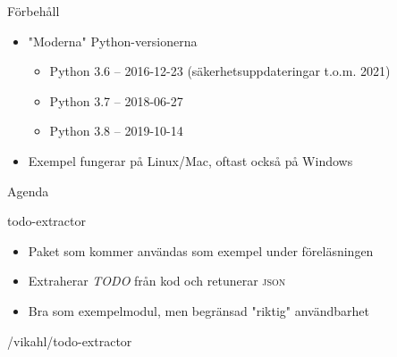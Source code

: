 \begin{frame}{Förbehåll}
  \begin{itemize}
    \item "Moderna" Python-versionerna
      \begin{itemize}
        \item Python 3.6 -- 2016-12-23 (säkerhetsuppdateringar t.o.m. 2021)
        \item Python 3.7 -- 2018-06-27
        \item Python 3.8 -- 2019-10-14
      \end{itemize}
    \item Exempel fungerar på Linux/Mac, oftast också på Windows
  \end{itemize}
\end{frame}


\begin{frame}{Agenda}
  \setcounter{tocdepth}{1}
  \tableofcontents
\end{frame}

\begin{frame}{todo-extractor}
  \begin{itemize}
    \item Paket som kommer användas som exempel under föreläsningen
    \item Extraherar \textit{TODO} från kod och retunerar \textsc{json}
    \item Bra som exempelmodul, men begränsad "riktig" användbarhet
  \end{itemize}

  /vikahl/todo-extractor

\end{frame}
